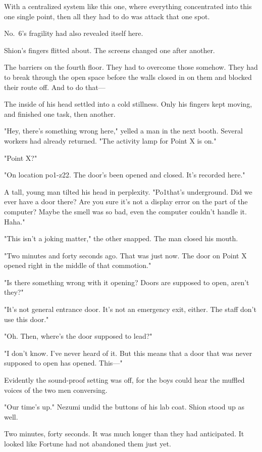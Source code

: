 With a centralized system like this one, where everything concentrated
into this one single point, then all they had to do was attack that one
spot.

No.~6's fragility had also revealed itself here.

Shion's fingers flitted about. The screens changed one after another.

The barriers on the fourth floor. They had to overcome those somehow.
They had to break through the open space before the walls closed in on
them and blocked their route off.
And to do that---

The inside of his head settled into a cold stillness. Only his fingers
kept moving, and finished one task, then another.

"Hey, there's something wrong here," yelled a man in the next booth.
Several workers had already returned. "The activity lamp for Point X is
on."

"Point X?"

"On location po1-z22. The door's been opened and closed. It's recorded
here."

A tall, young man tilted his head in perplexity. "Po1\el that's
underground. Did we ever have a door there? Are you sure it's not a
display error on the part of the computer? Maybe the smell was so bad,
even the computer couldn't handle it. Haha."

"This isn't a joking matter," the other snapped. The man closed his
mouth.

"Two minutes and forty seconds ago. That was just now. The door on Point
X opened right in the middle of that commotion."

"Is there something wrong with it opening? Doors are supposed to open,
aren't they?"

"It's not general entrance door. It's not an emergency exit, either. The
staff don't use this door."

"Oh. Then, where's the door supposed to lead?"

"I don't know. I've never heard of it. But this means that a door that
was never supposed to open has opened. This---"

Evidently the sound-proof setting was off, for the boys could hear the
muffled voices of the two men conversing.

"Our time's up." Nezumi undid the buttons of his lab coat. Shion stood
up as well.

Two minutes, forty seconds. It was much longer than they had
anticipated. It looked like Fortune had not abandoned them just yet.

